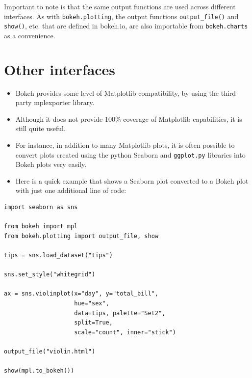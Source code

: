 \documentclass[a4paper,12pt]{article}
\begin{document}
\newpage

Important to note is that the same output functions are used across different interfaces. As with \texttt{bokeh.plotting}, the output functions \texttt{output\_file()} and \texttt{show()}, etc. that are defined in bokeh.io, are also importable from \texttt{bokeh.charts} as a convenience.

\newpage
\section*{Other interfaces}
\begin{itemize}

\item Bokeh provides some level of Matplotlib compatibility, by using the third-party mplexporter library. 
\item Although it does not provide 100\% coverage of Matplotlib capabilities, it is still quite useful. 
\item For instance, in addition to many Matplotlib plots, it is often possible to convert plots created using the python Seaborn and \texttt{ggplot.py} libraries into Bokeh plots very easily. \item Here is a quick example that shows a Seaborn plot converted to a Bokeh plot with just one additional line of code:
\end{itemize}
\newpage

	\begin{verbatim}
import seaborn as sns

from bokeh import mpl
from bokeh.plotting import output_file, show

tips = sns.load_dataset("tips")

sns.set_style("whitegrid")

ax = sns.violinplot(x="day", y="total_bill", 
                    hue="sex",
                    data=tips, palette="Set2", 
                    split=True,
                    scale="count", inner="stick")

output_file("violin.html")

show(mpl.to_bokeh())
	
\end{verbatim}
\end{document}
